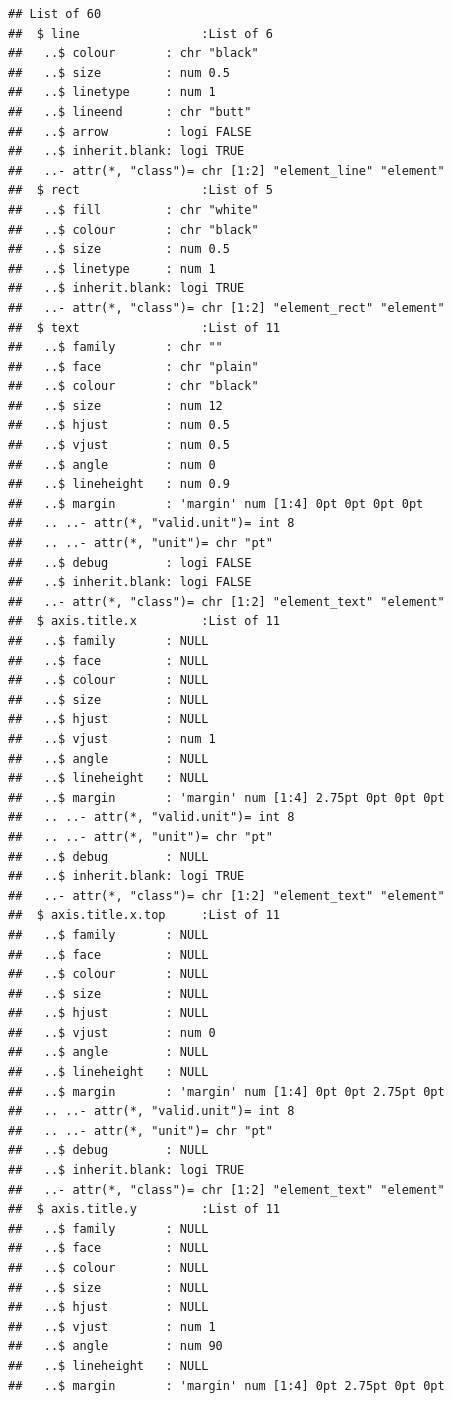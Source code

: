 \documentclass[]{article}
\begin{document}
\begin{verbatim}
## List of 60
##  $ line                 :List of 6
##   ..$ colour       : chr "black"
##   ..$ size         : num 0.5
##   ..$ linetype     : num 1
##   ..$ lineend      : chr "butt"
##   ..$ arrow        : logi FALSE
##   ..$ inherit.blank: logi TRUE
##   ..- attr(*, "class")= chr [1:2] "element_line" "element"
##  $ rect                 :List of 5
##   ..$ fill         : chr "white"
##   ..$ colour       : chr "black"
##   ..$ size         : num 0.5
##   ..$ linetype     : num 1
##   ..$ inherit.blank: logi TRUE
##   ..- attr(*, "class")= chr [1:2] "element_rect" "element"
##  $ text                 :List of 11
##   ..$ family       : chr ""
##   ..$ face         : chr "plain"
##   ..$ colour       : chr "black"
##   ..$ size         : num 12
##   ..$ hjust        : num 0.5
##   ..$ vjust        : num 0.5
##   ..$ angle        : num 0
##   ..$ lineheight   : num 0.9
##   ..$ margin       : 'margin' num [1:4] 0pt 0pt 0pt 0pt
##   .. ..- attr(*, "valid.unit")= int 8
##   .. ..- attr(*, "unit")= chr "pt"
##   ..$ debug        : logi FALSE
##   ..$ inherit.blank: logi FALSE
##   ..- attr(*, "class")= chr [1:2] "element_text" "element"
##  $ axis.title.x         :List of 11
##   ..$ family       : NULL
##   ..$ face         : NULL
##   ..$ colour       : NULL
##   ..$ size         : NULL
##   ..$ hjust        : NULL
##   ..$ vjust        : num 1
##   ..$ angle        : NULL
##   ..$ lineheight   : NULL
##   ..$ margin       : 'margin' num [1:4] 2.75pt 0pt 0pt 0pt
##   .. ..- attr(*, "valid.unit")= int 8
##   .. ..- attr(*, "unit")= chr "pt"
##   ..$ debug        : NULL
##   ..$ inherit.blank: logi TRUE
##   ..- attr(*, "class")= chr [1:2] "element_text" "element"
##  $ axis.title.x.top     :List of 11
##   ..$ family       : NULL
##   ..$ face         : NULL
##   ..$ colour       : NULL
##   ..$ size         : NULL
##   ..$ hjust        : NULL
##   ..$ vjust        : num 0
##   ..$ angle        : NULL
##   ..$ lineheight   : NULL
##   ..$ margin       : 'margin' num [1:4] 0pt 0pt 2.75pt 0pt
##   .. ..- attr(*, "valid.unit")= int 8
##   .. ..- attr(*, "unit")= chr "pt"
##   ..$ debug        : NULL
##   ..$ inherit.blank: logi TRUE
##   ..- attr(*, "class")= chr [1:2] "element_text" "element"
##  $ axis.title.y         :List of 11
##   ..$ family       : NULL
##   ..$ face         : NULL
##   ..$ colour       : NULL
##   ..$ size         : NULL
##   ..$ hjust        : NULL
##   ..$ vjust        : num 1
##   ..$ angle        : num 90
##   ..$ lineheight   : NULL
##   ..$ margin       : 'margin' num [1:4] 0pt 2.75pt 0pt 0pt

\end{verbatim}
\end{document}
